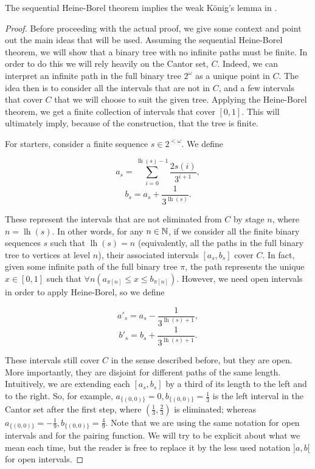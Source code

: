 \documentclass[../main.tex]{memoir}
\begin{document}
\begin{theorem}
  The sequential Heine-Borel theorem implies the weak König's lemma in \rca.
\end{theorem}
\begin{proof}
  Before proceeding with the actual proof, we give some context and point out the main ideas that will be used. Assuming the sequential Heine-Borel theorem, we will show that a binary tree with no infinite paths must be finite. In order to do this we will rely heavily on the Cantor set, $C$. Indeed, we can interpret an infinite path in the full binary tree $2^{\omega}$ as a unique point in $C$. The idea then is to consider all the intervals that are not in $C$, and a few intervals that cover $C$ that we will choose to suit the given tree. Applying the Heine-Borel theorem, we get a finite collection of intervals that cover $[0, 1]$. This will ultimately imply, because of the construction, that the tree is finite.

  For starters, consider a finite sequence $s \in 2^{<\omega}$. We define

  \[ a_s = \sum_{i = 0}^{\operatorname{lh}(s) - 1} \frac{2s(i)}{3^{i + 1}}, \]
  \[ b_s = a_s + \frac{1}{3^{\operatorname{lh}(s)}}. \]

  These represent the intervals that are not eliminated from $C$ by stage $n$, where $n = \operatorname{lh}(s)$. In other words, for any $n \in \mathbb{N}$, if we consider all the finite binary sequences $s$ such that $\operatorname{lh}(s) = n$ (equivalently, all the paths in the full binary tree to vertices at level $n$), their associated intervals $[a_s, b_s]$ cover $C$. In fact, given some infinite path of the full binary tree $\pi$, the path represents the unique $x \in [0, 1]$ such that $\forall n (a_{\pi[n]} \le x \le b_{\pi[n]})$. However, we need open intervals in order to apply Heine-Borel, so we define

  \[ a'_s = a_s - \frac{1}{3^{\operatorname{lh}(s) + 1}}, \]
  \[ b'_s = b_s + \frac{1}{3^{\operatorname{lh}(s) + 1}}. \]

  These intervals still cover $C$ in the sense described before, but they are open. More importantly, they are disjoint for different paths of the same length. Intuitively, we are extending each $[a_s, b_s]$ by a third of its length to the left and to the right. So, for example, $a_{\{(0, 0)\}} = 0, b_{\{(0, 0)\}} = \frac13$ is the left interval in the Cantor set after the first step, where $(\frac13, \frac23)$ is eliminated; whereas $a_{\{(0, 0)\}} = -\frac19, b_{\{(0, 0)\}} = \frac49$. Note that we are using the same notation for open intervals and for the pairing function. We will try to be explicit about what we mean each time, but the reader is free to replace it by the less used notation $]a, b[$ for open intervals.


\end{proof}
\end{document}
